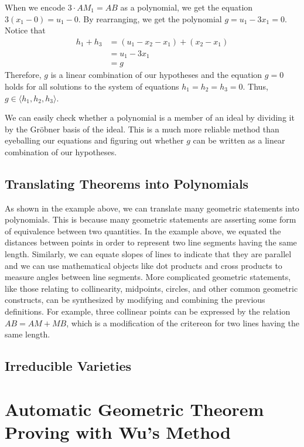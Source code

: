 \documentclass{article}
\theoremstyle{plain}
\theoremstyle{definition}
\theoremstyle{remark}
\newcommand{\gro}{Gr\"obner }
\begin{document}
When we encode $3\cdot AM_1 = AB$ as a polynomial, we get the equation $3 (x_1 - 0) = u_1 - 0$. By rearranging, we get the polynomial $g = u_1 - 3x_1 = 0$.
Notice that
\begin{align*}
    h_1 + h_3 & = (u_1 - x_2 - x_1) + (x_2 - x_1)\\
              & = u_1 - 3x_1\\
              & = g
\end{align*}
Therefore, $g$ is a linear combination of our hypotheses and the equation $g = 0$ holds for all solutions to the system of equations $h_1 = h_2 = h_3 = 0$.
Thus, $g \in \langle h_1,h_2,h_3 \rangle$.

We can easily check whether a polynomial is a member of an ideal by dividing it by the \gro basis of the ideal.
This is a much more reliable method than eyeballing our equations and figuring out whether $g$ can be written as a linear combination of our hypotheses.

\subsection{Translating Theorems into Polynomials}
As shown in the example above, we can translate many geometric statements into polynomials. 
This is because many geometric statements are asserting some form of equivalence between two quantities.
In the example above, we equated the distances between points in order to represent two line segments having the same length.
Similarly, we can equate slopes of lines to indicate that they are parallel and we can use mathematical objects like dot products and cross products to measure angles between line segments.
More complicated geometric statements, like those relating to collinearity, midpoints, circles, and other common geometric constructs, 
can be synthesized by modifying and combining the previous definitions.
For example, three collinear points can be expressed by the relation $AB = AM + MB$, which is a modification of the critereon for two lines having the same length.
\subsection{Irreducible Varieties}

\section{Automatic Geometric Theorem Proving with Wu's Method}
\end{document}
